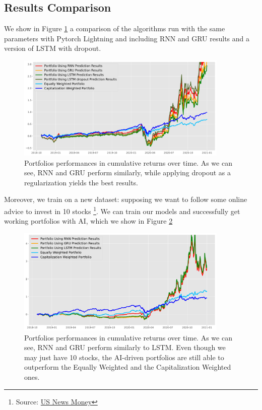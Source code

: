 \documentclass[12pt]{article}
\begin{document}
\subsection{Results Comparison}
We show in Figure \ref{fig:portfolios_multi_same_dset} a comparison of the algorithms run with the same parameters with Pytorch Lightning and including RNN and GRU results and a version of LSTM with dropout.

\begin{figure}[h!]
    \centering
    \includegraphics[width=0.9\textwidth]{images/portfolio_multi_same_dset.pdf}
    \caption{Portfolios performances in cumulative returns over time. As we can see, RNN and GRU perform similarly, while applying dropout as a regularization yields the best results.}
    \label{fig:portfolios_multi_same_dset}
\end{figure}

Moreover, we train on a new dataset: supposing we want to follow some online advice to invest in 10 stocks \footnote{Source: \href{https://money.usnews.com/investing/stock-market-news/slideshows/best-stocks-to-buy-this-year?slide=12}{US News Money}}. We can train our models and successfully get working portfolios with AI, which we show in Figure \ref{fig:portfolio_multi_new}

\begin{figure}[h!]
    \centering
    \includegraphics[width=0.9\textwidth]{images/portfolio_multi_new.pdf}
    \caption{Portfolios performances in cumulative returns over time. As we can see, RNN and GRU perform similarly to LSTM. Even though we may just have 10 stocks, the AI-driven portfolios are still able to outperform the Equally Weighted and the Capitalization Weighted ones.}
    \label{fig:portfolio_multi_new}
\end{figure}





\end{document}
